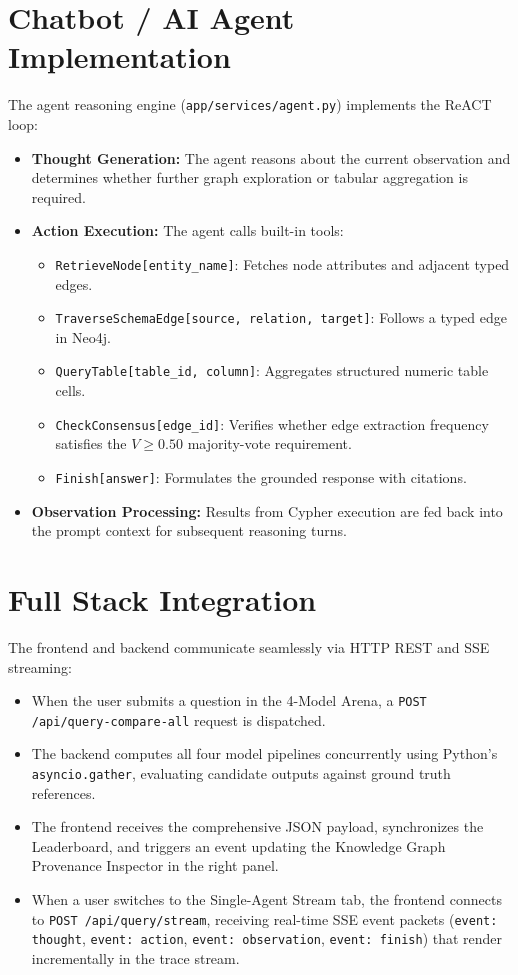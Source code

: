 \section{Chatbot / AI Agent Implementation}
The agent reasoning engine (\texttt{app/services/agent.py}) implements the ReACT loop:
\begin{itemize}
    \item \textbf{Thought Generation:} The agent reasons about the current observation and determines whether further graph exploration or tabular aggregation is required.
    \item \textbf{Action Execution:} The agent calls built-in tools:
    \begin{itemize}
        \item \texttt{RetrieveNode[entity\_name]}: Fetches node attributes and adjacent typed edges.
        \item \texttt{TraverseSchemaEdge[source, relation, target]}: Follows a typed edge in Neo4j.
        \item \texttt{QueryTable[table\_id, column]}: Aggregates structured numeric table cells.
        \item \texttt{CheckConsensus[edge\_id]}: Verifies whether edge extraction frequency satisfies the $V \ge 0.50$ majority-vote requirement.
        \item \texttt{Finish[answer]}: Formulates the grounded response with citations.
    \end{itemize}
    \item \textbf{Observation Processing:} Results from Cypher execution are fed back into the prompt context for subsequent reasoning turns.
\end{itemize}

\section{Full Stack Integration}
The frontend and backend communicate seamlessly via HTTP REST and SSE streaming:
\begin{itemize}
    \item When the user submits a question in the 4-Model Arena, a \texttt{POST /api/query-compare-all} request is dispatched.
    \item The backend computes all four model pipelines concurrently using Python's \texttt{asyncio.gather}, evaluating candidate outputs against ground truth references.
    \item The frontend receives the comprehensive JSON payload, synchronizes the Leaderboard, and triggers an event updating the Knowledge Graph Provenance Inspector in the right panel.
    \item When a user switches to the Single-Agent Stream tab, the frontend connects to \texttt{POST /api/query/stream}, receiving real-time SSE event packets (\texttt{event: thought}, \texttt{event: action}, \texttt{event: observation}, \texttt{event: finish}) that render incrementally in the trace stream.
\end{itemize}

